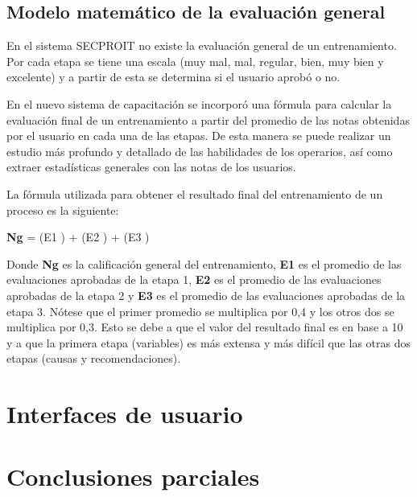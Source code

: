 \subsection{Modelo matemático de la evaluación general}
En el sistema SECPROIT no existe la evaluación general de un entrenamiento. Por cada etapa se tiene una escala (muy mal, mal, regular, bien, muy bien y excelente) y a partir de esta se determina si el usuario aprobó o no.

En el nuevo sistema de capacitación se incorporó una fórmula para calcular la evaluación final de un entrenamiento a partir del promedio de las notas obtenidas por el usuario en cada una de las etapas. De esta manera se puede realizar un estudio más profundo y detallado de las habilidades de los operarios, así como extraer estadísticas generales con las notas de los usuarios.

La fórmula utilizada para obtener el resultado final del entrenamiento de un proceso es la siguiente:

\vspace{0.15cm}
\begin{center}
\begin{Large}
\textbf{Ng} = (E1 ) + (E2 ) + (E3 )
\end{Large}
\end{center}
\vspace{0.15cm}

Donde \textbf{Ng} es la calificación general del entrenamiento, \textbf{E1} es el promedio de las evaluaciones aprobadas de la etapa 1, \textbf{E2} es el promedio de las evaluaciones aprobadas de la etapa 2 y \textbf{E3} es el promedio de las evaluaciones aprobadas de la etapa 3. Nótese que el primer promedio se multiplica por 0,4 y los otros dos se multiplica por 0,3. Esto se debe a que el valor del resultado final es en base a 10 y a que la primera etapa (variables) es más extensa y más difícil que las otras dos etapas (causas y recomendaciones).

\section{Interfaces de usuario}

\section{Conclusiones parciales}
